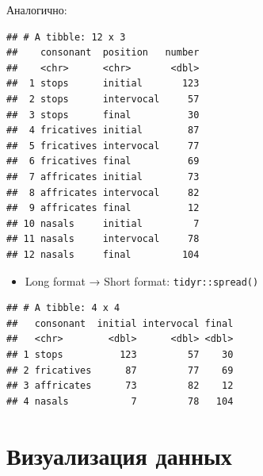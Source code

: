\documentclass[]{book}
\newenvironment{Shaded}{\begin{snugshade}}{\end{snugshade}}
\newcommand{\DataTypeTok}[1]{\textcolor[rgb]{0.13,0.29,0.53}{#1}}
\newcommand{\KeywordTok}[1]{\textcolor[rgb]{0.13,0.29,0.53}{\textbf{#1}}}
\newcommand{\NormalTok}[1]{#1}
\newcommand{\OperatorTok}[1]{\textcolor[rgb]{0.81,0.36,0.00}{\textbf{#1}}}
\newcommand{\StringTok}[1]{\textcolor[rgb]{0.31,0.60,0.02}{#1}}
\providecommand{\tightlist}{%
  \setlength{\itemsep}{0pt}\setlength{\parskip}{0pt}}
\begin{document}
Аналогично:

\begin{Shaded}
\end{Shaded}

\begin{verbatim}
## # A tibble: 12 x 3
##    consonant  position   number
##    <chr>      <chr>       <dbl>
##  1 stops      initial       123
##  2 stops      intervocal     57
##  3 stops      final          30
##  4 fricatives initial        87
##  5 fricatives intervocal     77
##  6 fricatives final          69
##  7 affricates initial        73
##  8 affricates intervocal     82
##  9 affricates final          12
## 10 nasals     initial         7
## 11 nasals     intervocal     78
## 12 nasals     final         104
\end{verbatim}

\begin{itemize}
\tightlist
\item
  Long format → Short format: \texttt{tidyr::spread()}
\end{itemize}

\begin{Shaded}
\end{Shaded}

\begin{verbatim}
## # A tibble: 4 x 4
##   consonant  initial intervocal final
##   <chr>        <dbl>      <dbl> <dbl>
## 1 stops          123         57    30
## 2 fricatives      87         77    69
## 3 affricates      73         82    12
## 4 nasals           7         78   104
\end{verbatim}

\hypertarget{viz_1}{%
\chapter{Визуализация данных}\label{viz_1}}
\end{document}
